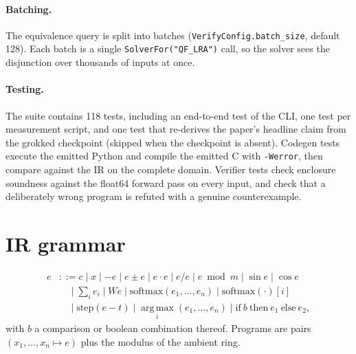 \documentclass[11pt]{article}
\newcommand{\argmax}{\operatorname*{arg\,max}}
\newcommand{\code}[1]{\texttt{#1}}
\begin{document}
\paragraph{Batching.}
The equivalence query is split into batches (\code{VerifyConfig.batch\_size},
default 128). Each batch is a single \code{SolverFor("QF\_LRA")} call, so the
solver sees the disjunction over thousands of inputs at once.

\paragraph{Testing.}
The suite contains 118 tests, including an end-to-end test of the CLI, one test
per measurement script, and one test that re-derives the paper's headline claim
from the grokked checkpoint (skipped when the checkpoint is absent). Codegen
tests execute the emitted Python and compile the emitted C with \code{-Werror}, then compare against the IR on the
complete domain. Verifier tests check enclosure soundness against the float64
forward pass on every input, and check that a deliberately wrong program is
refuted with a genuine counterexample.

\section{IR grammar}
\label{app:grammar}

\begin{align*}
  e &::= c \mid x \mid -e \mid e \pm e \mid e \cdot e \mid e / e
       \mid e \bmod m \mid \sin e \mid \cos e \\
    &\quad\mid \textstyle\sum_i e_i \mid W e \mid \mathrm{softmax}(e_1,\dots,e_n)
       \mid \mathrm{softmax}(\cdot)[i] \\
    &\quad\mid \mathrm{step}(e - t) \mid \argmax_i(e_1,\dots,e_n)
       \mid \mathrm{if}\ b\ \mathrm{then}\ e_1\ \mathrm{else}\ e_2 ,
\end{align*}
with $b$ a comparison or boolean combination thereof. Programs are pairs
$(x_1,\dots,x_n \mapsto e)$ plus the modulus of the ambient ring.
\end{document}
